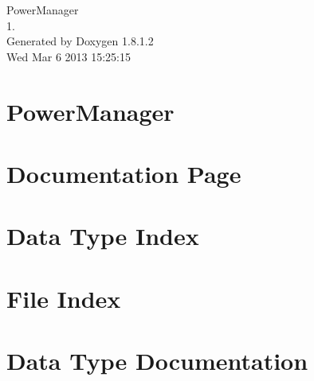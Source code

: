 \documentclass{book}
\begin{document}
\hypersetup{pageanchor=false,citecolor=blue}
\begin{titlepage}
\vspace*{7cm}
\begin{center}
{\Large Power\-Manager \\[1ex]\large 1. }\\
\vspace*{1cm}
{\large Generated by Doxygen 1.8.1.2}\\
\vspace*{0.5cm}
{\small Wed Mar 6 2013 15:25:15}\\
\end{center}
\end{titlepage}
\clearemptydoublepage
{}
\tableofcontents
\clearemptydoublepage
{}
\hypersetup{pageanchor=true,citecolor=blue}
\chapter{Power\-Manager}
\label{index}\hypertarget{index}{}
\chapter{Documentation Page}
\label{A}
\hypertarget{A}{}

\chapter{Data Type Index}

\chapter{File Index}

\chapter{Data Type Documentation}



































\end{document}
